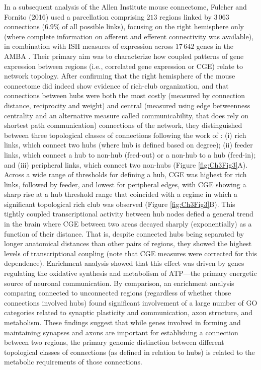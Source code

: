 In a subsequent analysis of the Allen Institute mouse connectome, Fulcher and Fornito (2016) used a parcellation comprising $213$ regions linked by $3\,063$ connections ($6.9$\% of all possible links), focusing on the right hemisphere only (where complete information on afferent and efferent connectivity was available), in combination with ISH measures of expression across $17\,642$ genes in the AMBA \citep{Lein2007a}. 
Their primary aim was to characterize how coupled patterns of gene expression between regions (i.e., correlated gene expression or CGE) relate to network topology. After confirming that the right hemisphere of the mouse connectome did indeed show evidence of rich-club organization, and that connections between hubs were both the most costly (measured by connection distance, reciprocity and weight) and central (measured using edge betweenness centrality and an alternative measure called communicability, that does rely on shortest path communication) connections of the network, they distinguished between three topological classes of connections following the work of \citet{VandenHeuvel2012}: (i) rich links, which connect two hubs (where hub is defined based on degree); (ii) feeder links, which connect a hub to non-hub (feed-out) or a non-hub to a hub (feed-in); 
and (iii) peripheral links, which connect two non-hubs (Figure \ref{fig:Ch3Fig3}A). 
Across a wide range of thresholds for defining a hub, CGE was highest for rich links, followed by feeder, and lowest for peripheral edges, with CGE showing a sharp rise at a hub threshold range that coincided with a regime in which a significant topological rich club was observed (Figure \ref{fig:Ch3Fig3}B). This tightly coupled transcriptional activity between hub nodes defied a general trend in the brain where CGE between two areas decayed sharply (exponentially) as a function of their distance. That is, despite connected hubs being separated by longer anatomical distances than other pairs of regions, they showed the highest levels of transcriptional coupling (note that CGE measures were corrected for this dependence). 
Enrichment analysis showed that this effect was driven by genes regulating the oxidative synthesis and metabolism of ATP---the primary energetic source of neuronal communication. By comparison, an enrichment analysis comparing connected to unconnected regions (regardless of whether those connections involved hubs) found significant involvement of a large number of GO categories related to synaptic plasticity and communication, axon structure, and metabolism. These findings suggest that while genes involved in forming and maintaining synapses and axons are important for establishing a connection between two regions, the primary genomic distinction between different topological classes of connections (as defined in relation to hubs) is related to the metabolic requirements of those connections.

